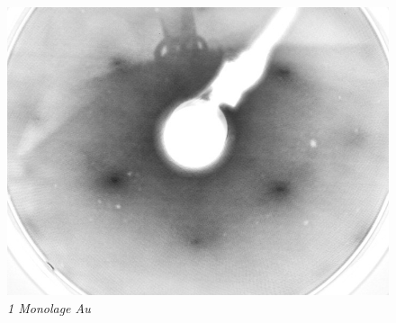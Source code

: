 \documentclass{beamer}
\begin{document}
\begin{frame}
\begin{minipage}{\linewidth}
\begin{figure}[H]
	\hfill
	\begin{minipage}[b]{0.3\textwidth} 
		\includegraphics[width=\textwidth]{bilder/1ML_E207}
		\caption*{\textit{1 Monolage Au}} 
	\end{minipage}
	

\end{figure}
\end{minipage}
\end{frame}
\end{document}
